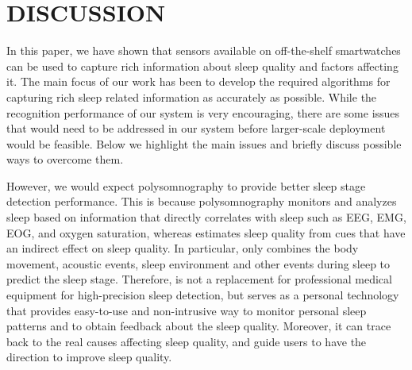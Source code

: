 \section{DISCUSSION}\label{sec:discussion}

In this paper, we have shown that sensors available on off-the-shelf smartwatches can be used to capture rich information about sleep
quality and factors affecting it. The main focus of our work has been to develop the required algorithms for capturing rich sleep related
information as accurately as possible. While the recognition performance of our system is very encouraging, there are some issues that
would need to be addressed in our system before larger-scale deployment would be feasible. Below we highlight the main issues and briefly
discuss possible ways to overcome them.


  However, we would expect polysomnography to provide better sleep stage detection performance. This is because polysomnography monitors and analyzes sleep
      based on information that directly correlates with sleep such as EEG, EMG, EOG, and oxygen saturation, whereas {\systemname}
      estimates sleep quality from cues that have an indirect effect on sleep quality. In particular, \systemname only combines the body
      movement, acoustic events, sleep environment and other events during sleep to predict the sleep stage. Therefore, {\systemname} is
      not a replacement for professional medical equipment for high-precision sleep detection, but serves as a personal technology that
      provides easy-to-use and non-intrusive way to monitor personal sleep patterns and to obtain feedback about the sleep quality.
      Moreover, it can trace back to the real causes affecting sleep quality, and guide users to have the direction to improve sleep
      quality. 

